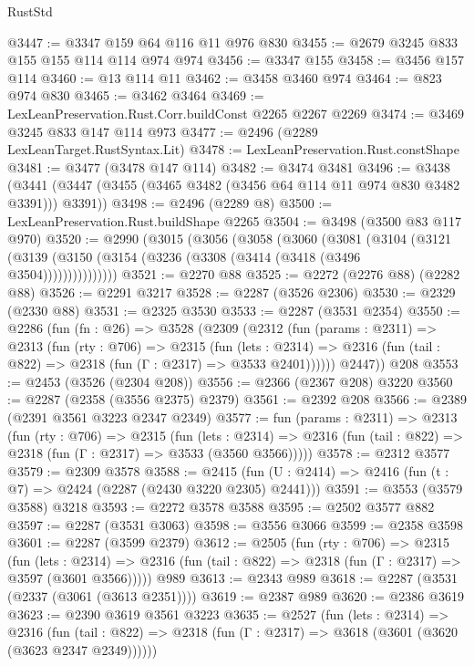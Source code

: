 \begin{lexlean}{RustStd}
\begin{coremodule}
@3447 := @3347 @159 @64 @116 @11 @976 @830
@3455 := @2679 @3245 @833 @155 @155 @114 @114 @974 @974
@3456 := @3347 @155
@3458 := @3456 @157 @114
@3460 := @13 @114 @11
@3462 := @3458 @3460 @974
@3464 := @823 @974 @830
@3465 := @3462 @3464
@3469 := LexLeanPreservation.Rust.Corr.buildConst @2265 @2267 @2269
@3474 := @3469 @3245 @833 @147 @114 @973
@3477 := @2496 (@2289 LexLeanTarget.RustSyntax.Lit)
@3478 := LexLeanPreservation.Rust.constShape
@3481 := @3477 (@3478 @147 @114)
@3482 := @3474 @3481
@3496 := @3438
    (@3441 (@3447 (@3455 (@3465 @3482 (@3456 @64 @114 @11 @974 @830 @3482 @3391))) @3391))
@3498 := @2496 (@2289 @8)
@3500 := LexLeanPreservation.Rust.buildShape @2265
@3504 := @3498 (@3500 @83 @117 @970)
@3520 := @2990
    (@3015
      (@3056
        (@3058
          (@3060
            (@3081
              (@3104
                (@3121 (@3139 (@3150 (@3154 (@3236 (@3308 (@3414 (@3418 (@3496 @3504)))))))))))))))
@3521 := @2270 @88
@3525 := @2272 (@2276 @88) (@2282 @88)
@3526 := @2291 @3217
@3528 := @2287 (@3526 @2306)
@3530 := @2329 (@2330 @88)
@3531 := @2325 @3530
@3533 := @2287 (@3531 @2354)
@3550 := @2286
    (fun (fn : @26) =>
    @3528
      (@2309
        (@2312
          (fun (params : @2311) =>
          @2313
            (fun (rty : @706) =>
            @2315
              (fun (lets : @2314) =>
              @2316 (fun (tail : @822) => @2318 (fun (Γ : @2317) => @3533 @2401))))))
        @2447))
    @208
@3553 := @2453 (@3526 (@2304 @208))
@3556 := @2366 (@2367 @208) @3220
@3560 := @2287 (@2358 (@3556 @2375) @2379)
@3561 := @2392 @208
@3566 := @2389 (@2391 @3561 @3223 @2347 @2349)
@3577 := fun (params : @2311) =>
  @2313
    (fun (rty : @706) =>
    @2315
      (fun (lets : @2314) =>
      @2316 (fun (tail : @822) => @2318 (fun (Γ : @2317) => @3533 (@3560 @3566)))))
@3578 := @2312 @3577
@3579 := @2309 @3578
@3588 := @2415 (fun (U : @2414) => @2416 (fun (t : @7) => @2424 (@2287 (@2430 @3220 @2305) @2441)))
@3591 := @3553 (@3579 @3588) @3218
@3593 := @2272 @3578 @3588
@3595 := @2502 @3577 @882
@3597 := @2287 (@3531 @3063)
@3598 := @3556 @3066
@3599 := @2358 @3598
@3601 := @2287 (@3599 @2379)
@3612 := @2505
    (fun (rty : @706) =>
    @2315
      (fun (lets : @2314) =>
      @2316 (fun (tail : @822) => @2318 (fun (Γ : @2317) => @3597 (@3601 @3566)))))
    @989
@3613 := @2343 @989
@3618 := @2287 (@3531 (@2337 (@3061 (@3613 @2351))))
@3619 := @2387 @989
@3620 := @2386 @3619
@3623 := @2390 @3619 @3561 @3223
@3635 := @2527
    (fun (lets : @2314) =>
    @2316
      (fun (tail : @822) => @2318 (fun (Γ : @2317) => @3618 (@3601 (@3620 (@3623 @2347 @2349))))))

\end{coremodule}
\end{lexlean}

